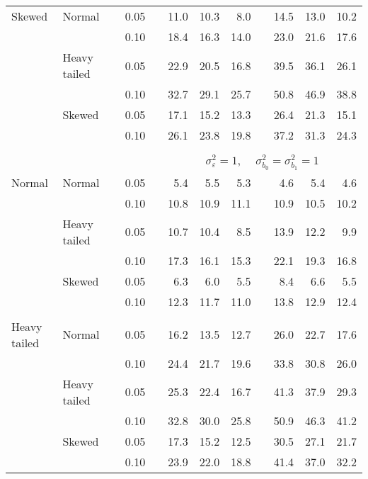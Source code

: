 \begin{table}[ht]
\begin{scriptsize}
\begin{center}
\begin{tabular}{ll p{.1cm} c p{.1cm} rrr p{.1cm} rrr}
Skewed       & Normal       && 0.05 &&   11.0 & 10.3 & 8.0 &   & 14.5 & 13.0 & 10.2 \\ 
             &              && 0.10 &&   18.4 & 16.3 & 14.0 &   & 23.0 & 21.6 & 17.6 \\ 
             & Heavy tailed && 0.05 &&   22.9 & 20.5 & 16.8 &   & 39.5 & 36.1 & 26.1 \\ 
             &              && 0.10 &&   32.7 & 29.1 & 25.7 &   & 50.8 & 46.9 & 38.8 \\ 
             & Skewed       && 0.05 &&   17.1 & 15.2 & 13.3 &   & 26.4 & 21.3 & 15.1 \\ 
             &              && 0.10 &&   26.1 & 23.8 & 19.8 &   & 37.2 & 31.3 & 24.3 \\ 

&&&&&&&&&&&\\
& && && \multicolumn{7}{c}{$\sigma_{\varepsilon}^2 = 1$, \ \ $\sigma_{b_0}^2 = \sigma_{b_1}^2 = 1$} \\ \cline{6-12}
\rowcolor{gray!20}Normal       & Normal       && 0.05 &&   5.4 & 5.5 & 5.3 &   & 4.6 & 5.4 & 4.6 \\ 
\rowcolor{gray!20}             &              && 0.10 &&   10.8 & 10.9 & 11.1 &   & 10.9 & 10.5 & 10.2 \\ 
\rowcolor{gray!20}             & Heavy tailed && 0.05 &&   10.7 & 10.4 & 8.5 &   & 13.9 & 12.2 & 9.9 \\ 
\rowcolor{gray!20}             &              && 0.10 &&   17.3 & 16.1 & 15.3 &   & 22.1 & 19.3 & 16.8 \\ 
\rowcolor{gray!20}             & Skewed       && 0.05 &&   6.3 & 6.0 & 5.5 &   & 8.4 & 6.6 & 5.5 \\ 
\rowcolor{gray!20}             &              && 0.10 &&   12.3 & 11.7 & 11.0 &   & 13.8 & 12.9 & 12.4 \\ 
&&&&&&&&&&&\\
Heavy tailed & Normal       && 0.05 &&   16.2 & 13.5 & 12.7 &   & 26.0 & 22.7 & 17.6 \\ 
             &              && 0.10 &&   24.4 & 21.7 & 19.6 &   & 33.8 & 30.8 & 26.0 \\ 
             & Heavy tailed && 0.05 &&   25.3 & 22.4 & 16.7 &   & 41.3 & 37.9 & 29.3 \\ 
             &              && 0.10 &&   32.8 & 30.0 & 25.8 &   & 50.9 & 46.3 & 41.2 \\ 
             & Skewed       && 0.05 &&   17.3 & 15.2 & 12.5 &   & 30.5 & 27.1 & 21.7 \\ 
             &              && 0.10 &&   23.9 & 22.0 & 18.8 &   & 41.4 & 37.0 & 32.2 \\ 

\end{tabular}
\end{center}
\end{scriptsize}
\end{table}
